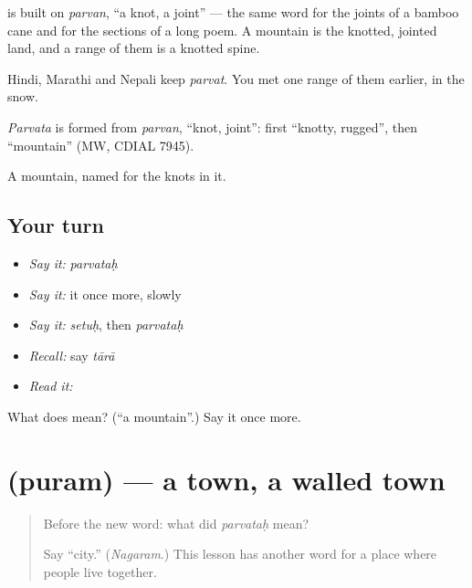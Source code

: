 \textbf{} is built on \emph{parvan}, \textquotedblleft{}a knot, a joint\textquotedblright{} — the same word for the joints of a bamboo cane and for the sections of a long poem. A mountain is the knotted, jointed land, and a range of them is a knotted spine.

Hindi, Marathi and Nepali keep \emph{parvat}. You met one range of them earlier, in the snow.

\begin{cousinweb}
\emph{Parvata} is formed from \emph{parvan}, \textquotedblleft{}knot, joint\textquotedblright{}: first \textquotedblleft{}knotty, rugged\textquotedblright{}, then \textquotedblleft{}mountain\textquotedblright{} (MW, CDIAL 7945).
\end{cousinweb}

\begin{grammarlens}[title={What you've built}]
A mountain, named for the knots in it.
\end{grammarlens}

\subsection*{Your turn}
\begin{itemize}
\raggedright
  \item \emph{Say it:} \emph{parvataḥ}
  \item \emph{Say it:} it once more, slowly
  \item \emph{Say it:} \emph{setuḥ}, then \emph{parvataḥ}
  \item \emph{Recall:} say \emph{tārā}
  \item \emph{Read it:} \textbf{}
\end{itemize}

\begin{tcolorbox}[breakable,colback=teal!4,colframe=teal!35!black,title={Before you move on}]
What does  mean? (\textquotedblleft{}a mountain\textquotedblright{}.) Say it once more.
\end{tcolorbox}
\section[\texorpdfstring{\sk{पुरम्} (puram)}{पुरम् (puram)}]{ (puram) — a town, a walled town}

\label{lesson:SA-C33-town}



\begin{quote}
Before the new word: what did \emph{parvataḥ} mean?

Say \textquotedblleft{}city.\textquotedblright{} (\emph{Nagaram}.) This lesson has another word for a place where people live together.
\end{quote}


